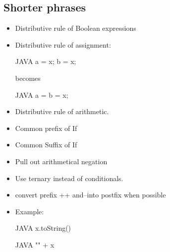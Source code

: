 \subsection{Shorter phrases}
\begin{itemize}
  \item Distributive rule of Boolean expressions
  \item Distributive rule of assignment:
        \begin{code}{JAVA}
a = x;
b = x;
  \end{code}
  becomes
  \begin{code}{JAVA}
a = b = x;
  \end{code}
  \item Distributive rule of arithmetic.
  \item Common prefix of If
  \item Common Suffix of If
  \item Pull out arithmetical negation
  \item Use ternary instead of conditionals.
  \item convert prefix ++ and--into postfix when possible
  \item Example:
        \begin{code}{JAVA}
x.toString()
  \end{code}
  \begin{code}{JAVA}
"" + x
  \end{code}
\end{itemize}

